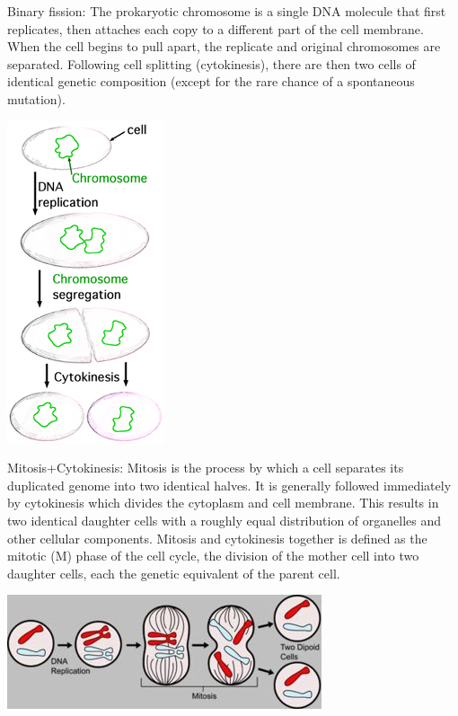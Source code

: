 \begin{definition}
Binary fission: The prokaryotic chromosome is a single DNA molecule that first replicates, then attaches each copy to a different part of the cell membrane. When the cell begins to pull apart, the replicate and original chromosomes are separated. Following cell splitting (cytokinesis), there are then two cells of identical genetic composition (except for the rare chance of a spontaneous mutation).
\end{definition}
\begin{center}
\includegraphics[width=.25\textwidth]{figs_steph/Binary_fission}
\end{center}



\begin{definition}
Mitosis+Cytokinesis: Mitosis is the process by which a cell separates its duplicated genome into two identical halves. It is generally followed immediately by cytokinesis which divides the cytoplasm and cell membrane. This results in two identical daughter cells with a roughly equal distribution of organelles and other cellular components. Mitosis and cytokinesis together is defined as the mitotic (M) phase of the cell cycle, the division of the mother cell into two daughter cells, each the genetic equivalent of the parent cell.
\end{definition}
\begin{center}
\includegraphics[width=.8\textwidth]{figs_steph/Mitosis}
\end{center}

